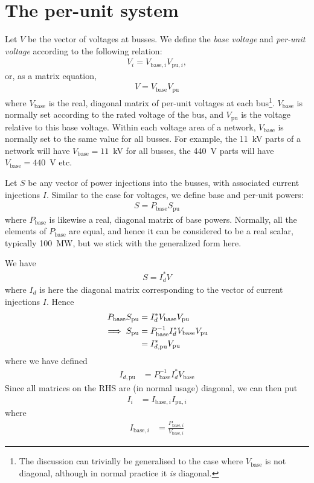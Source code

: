 \documentclass[11pt]{article}
\begin{document}
\section{The per-unit system}
Let $V$ be the vector of voltages at busses. We define the \emph{base voltage} and \emph{per-unit voltage} according to the following relation:
\begin{align}
	V_i = V_{\text{base},i}V_{\text{pu},i},
\end{align} or, as a matrix equation,
\begin{align}
	V = V_\text{base}V_\text{pu}
\end{align}
where $V_\text{base}$ is the real, diagonal matrix of per-unit voltages at each bus\footnote{The discussion can trivially be generalised to the case where $V_\text{base}$ is not diagonal, although in normal practice it \emph{is} diagonal.}. $V_\text{base}$ is normally set according to the rated voltage of the bus, and $V_\text{pu}$ is the voltage relative to this base voltage. Within each voltage area of a network, $V_\text{base}$ is normally set to the same value for all busses. For example, the 11~kV parts of a network will have $V_\text{base} = 11$~kV for all busses, the 440~V parts will have $V_\text{base} = 440$~V etc.

Let $S$ be any vector of power injections into the busses, with associated current injections $I$. Similar to the case for voltages, we define base and per-unit powers:
\begin{align}
	S = P_\text{base}S_\text{pu}
\end{align}
where $P_\text{base}$ is likewise a real, diagonal matrix of base powers. Normally, all the elements of $P_\text{base}$ are equal, and hence it can be considered to be a real scalar, typically 100~MW, but we stick with the generalized form here.

We have
\begin{align}
	S = I_d^*V
\end{align}
where $I_d$ is here the diagonal matrix corresponding to the vector of current injections $I$.
Hence
\begin{align}
	P_\text{base}S_\text{pu} &= I_d^*V_\text{base}V_\text{pu} \notag \\
	\implies S_\text{pu} &= P_\text{base}^{-1}I_d^*V_\text{base}V_\text{pu} \notag \\
	&= I_{d,\text{pu}}^*V_\text{pu} 
\end{align}
where we have defined
\begin{align}
	I_{d,\text{pu}} &= P_\text{base}^{-1}I_d^*V_\text{base}
\end{align}
Since all matrices on the RHS are (in normal usage) diagonal, we can then put
\begin{align}
	I_i &= I_{\text{base},i}I_{\text{pu},i}
\end{align}
where
\begin{align}
	I_{\text{base},i} &= \frac{P_{\text{base},i}}{V_{\text{base},i}}
	\label{EQ_IBASE_DEFN}
\end{align}
\end{document}
